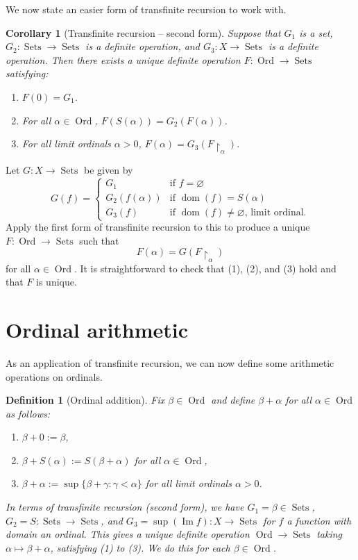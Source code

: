 \documentclass[10pt]{article}
\makeatletter
\DeclareMathOperator{\im}{Im}
\DeclareMathOperator{\Sets}{Sets}
\DeclareMathOperator{\Ord}{Ord}
\DeclareMathOperator{\dom}{dom}
\theoremstyle{newstyle}
\newtheorem{cor}[thm]{Corollary}
\newtheorem{defn}[thm]{Definition}
\newenvironment{pf}[1][\proofname]{\par
  \pushQED{\qed}%
  \normalfont \topsep0\p@\relax
  \trivlist
  \item[\hskip\labelsep\scshape
  #1\@addpunct{.}]\ignorespaces
}{%
  \popQED\endtrivlist\@endpefalse
}
\makeatother
\begin{document}
We now state an easier form of transfinite recursion to work with. 

\begin{cor}[Transfinite recursion -- second form]
Suppose that $G_1$ is a set, $G_2 : \Sets \to \Sets$ is a definite operation, and 
$G_3 : X \to \Sets$ is a definite operation. Then there exists a unique definite operation 
$F : \Ord \to \Sets$ satisfying: 
\begin{enumerate}[(1)]
    \item $F(0) = G_1$. 
    \item For all $\alpha \in \Ord$, $F(S(\alpha)) = G_2(F(\alpha))$. 
    \item For all limit ordinals $\alpha > 0$, $F(\alpha) = G_3(F \upharpoonright_\alpha)$.
\end{enumerate} 
\end{cor}
\begin{pf}
Let $G : X \to \Sets$ be given by 
\[ G(f) = \begin{cases} G_1 & \text{if $f = \varnothing$} \\ 
G_2(f(\alpha)) & \text{if $\dom(f) = S(\alpha)$} \\
G_3(f) & \text{if $\dom(f) \neq \varnothing$, limit ordinal.} \end{cases} \]
Apply the first form of transfinite recursion to this to produce a unique $F : \Ord \to \Sets$ 
such that 
\[ F(\alpha) = G(F \upharpoonright_\alpha) \] 
for all $\alpha \in \Ord$. It is straightforward to check that (1), (2), and (3) hold and that 
$F$ is unique.
\end{pf}

 
\newpage\section{Ordinal arithmetic} 

As an application of transfinite recursion, we can now define some arithmetic operations on ordinals. 

\begin{defn}[Ordinal addition] 
Fix $\beta \in \Ord$ and define $\beta + \alpha$ for all $\alpha \in \Ord$ as follows: 
\begin{enumerate}[(1)]
    \item $\beta + 0 := \beta$,
    \item $\beta + S(\alpha) := S(\beta + \alpha)$ for all $\alpha \in \Ord$,
    \item $\beta + \alpha := \sup \{\beta + \gamma : \gamma < \alpha\}$ for all limit ordinals 
    $\alpha > 0$.
\end{enumerate} 
In terms of transfinite recursion (second form), we have $G_1 = \beta \in \Sets$, 
$G_2 = S : \Sets \to \Sets$, and $G_3 = \sup(\im f) : X \to \Sets$ for $f$ a function with 
domain an ordinal. This gives a unique definite operation $\Ord \to \Sets$ taking 
$\alpha \mapsto \beta + \alpha$, satisfying (1) to (3). We do this for each $\beta \in \Ord$.
\end{defn}
\end{document}
